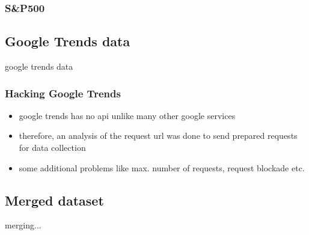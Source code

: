 \subsubsection{S\&P500}
\label{subsub:sp5000}
\cite{SP500}


\subsection{Google Trends data}
\label{subsec:gtdata}
google trends data

\subsubsection{Hacking Google Trends}
\label{subsub:hackinggt}
\begin{itemize}
	\item google trends has no api unlike many other google services
	\item therefore, an analysis of the request url was done to send prepared requests for data collection
	\item some additional problems like max. number of requests, request blockade etc.
\end{itemize}


\subsection{Merged dataset}
\label{subsec:merged}
merging...